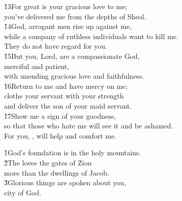 \begin{poetry}
\poeml \v{13}For great is your gracious love to me; \\
\poemll    you've delivered me from the depths of Sheol. \\
\poeml \v{14}God, arrogant men rise up against me, \\
\poemll    while a company of ruthless individuals want to kill me. \\
\poemlll       They do not have regard for you. \\
\poeml \v{15}But you, Lord, are a compassionate God, \\
\poemll    merciful and patient, \\
\poemlll       with unending gracious love and faithfulness. \\
\poeml \v{16}Return to me and have mercy on me; \\
\poemll    clothe your servant with your strength \\
\poemlll       and deliver the son of your maid servant. \\
\poeml \v{17}Show me a sign of your goodness, \\
\poemll    so that those who hate me will see it and be ashamed. \\
\poemlll       For you, , will help and comfort me.
\end{poetry}

\begin{poetry}
\poeml \v{1}God's foundation is in the holy mountains. \\
\poeml \v{2}The  loves the gates of Zion \\
\poemll    more than the dwellings of Jacob. \\
\poeml \v{3}Glorious things are spoken about you, \\
\poemll    city of God.
\end{poetry}

